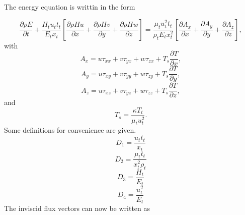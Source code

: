 \documentclass{report}
\newcommand{\dt}[1]{\frac{\partial #1}{\partial t}}
\newcommand{\dx}[1]{\frac{\partial #1}{\partial x}}
\newcommand{\dy}[1]{\frac{\partial #1}{\partial y}}
\newcommand{\dz}[1]{\frac{\partial #1}{\partial z}}
\begin{document}
The energy equation is writtin in the form

\begin{equation}
\label{e:energyBalanceNonDim}
\dt{\rho E}
 + \frac{H_t u_t t_t}{E_t x_t}
\left[
\dx{\rho H u} + \dy{\rho H v} + \dz{\rho H w} 
\right] =
 \frac{\mu_t u_t^2 t_t}{\rho_t E_t x_t^2} 
\left[
\dx{A_x} + \dy{A_y} + \dz{A_z} 
\right],
\end{equation}
with
\begin{equation}
\label{e:energyBalance_AxNonDim}
A_x = u \tau_{xx} + v \tau_{yx} + w \tau_{zx} + T_s\dx{T},
\end{equation}
\begin{equation}
\label{e:energyBalance_AyNonDim}
A_y = u \tau_{xy} + v \tau_{yy} + w \tau_{zy} + T_s\dy{T},
\end{equation}
\begin{equation}
\label{e:energyBalance_AzNonDim}
A_z = u \tau_{xz} + v \tau_{yz} + w \tau_{zz} + T_s\dz{T},
\end{equation}
and
\begin{equation}
\label{e:temperatureScale}
T_s = \frac{\kappa T_t}{\mu_t u_t^2}.
\end{equation}
Some definitions for convenience are given.
\begin{equation}
\label{e:dimGroup1}
D_1 = \frac{u_t t_t}{x_t}
\end{equation}
\begin{equation}
\label{e:dimGroup2}
D_2 = \frac{\mu_t t_t}{x_t^2 \rho_t}
\end{equation}
\begin{equation}
\label{e:dimGroup3}
D_3 = \frac{H_t}{E_t}
\end{equation}
\begin{equation}
\label{e:dimGroup4}
D_4 = \frac{u_t^2}{E_t}
\end{equation}
The inviscid flux vectors can now be written as
\end{document}
